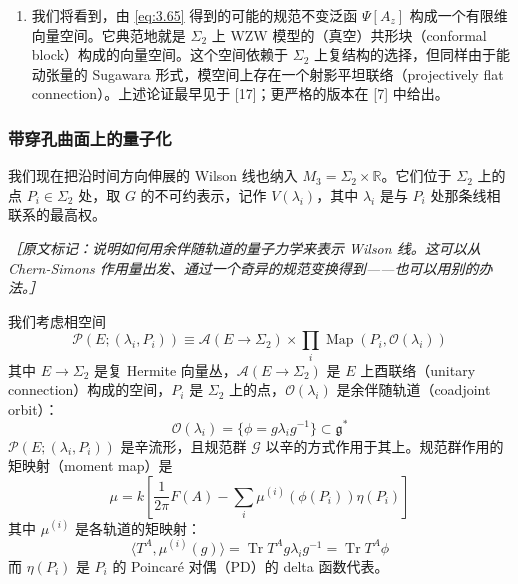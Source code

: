 
\begin{enumerate}[start=2]
  \item 我们将看到，由 \eqref{eq:3.65} 得到的可能的规范不变泛函 $\Psi[A_z]$ 构成一个有限维向量空间。它典范地就是 $\Sigma_2$ 上 WZW 模型的（真空）共形块（conformal block）构成的向量空间。这个空间依赖于 $\Sigma_2$ 上复结构的选择，但同样由于能动张量的 Sugawara 形式，模空间上存在一个射影平坦联络（projectively flat connection）。上述论证最早见于 [17]；更严格的版本在 [7] 中给出。
\end{enumerate}

\subsubsection{带穿孔曲面上的量子化} %

我们现在把沿时间方向伸展的 Wilson 线也纳入 $M_3=\Sigma_2\times\mathbb{R}$。它们位于 $\Sigma_2$ 上的点 $P_i\in\Sigma_2$ 处，取 $G$ 的不可约表示，记作 $V(\lambda_i)$，其中 $\lambda_i$ 是与 $P_i$ 处那条线相联系的最高权。

{\small\itshape ［原文标记：说明如何用余伴随轨道的量子力学来表示 Wilson 线。这可以从 Chern-Simons 作用量出发、通过一个奇异的规范变换得到——也可以用别的办法。］}

我们考虑相空间
\begin{equation}
  \mathcal{P}(E;(\lambda_i,P_i))\equiv\mathcal{A}(E\to\Sigma_2)\times\prod_i\operatorname{Map}(P_i,\mathcal{O}(\lambda_i))
  \tag{3.70}
  \label{eq:3.70}
\end{equation}
其中 $E\to\Sigma_2$ 是复 Hermite 向量丛，$\mathcal{A}(E\to\Sigma_2)$ 是 $E$ 上酉联络（unitary connection）构成的空间，$P_i$ 是 $\Sigma_2$ 上的点，$\mathcal{O}(\lambda_i)$ 是余伴随轨道（coadjoint orbit）：
\begin{equation}
  \mathcal{O}(\lambda_i)=\{\phi=g\lambda_i g^{-1}\}\subset\mathfrak{g}^*
  \tag{3.71}
  \label{eq:3.71}
\end{equation}
$\mathcal{P}(E;(\lambda_i,P_i))$ 是辛流形，且规范群 $\mathcal{G}$ 以辛的方式作用于其上。规范群作用的矩映射（moment map）是
\begin{equation}
  \mu=k\left[\frac{1}{2\pi}F(A)-\sum_i\mu^{(i)}(\phi(P_i))\eta(P_i)\right]
  \tag{3.72}
  \label{eq:3.72}
\end{equation}
其中 $\mu^{(i)}$ 是各轨道的矩映射：
\begin{equation}
  \langle T^A,\mu^{(i)}(g)\rangle=\operatorname{Tr}T^A g\lambda_i g^{-1}=\operatorname{Tr}T^A\phi
  \tag{3.73}
  \label{eq:3.73}
\end{equation}
而 $\eta(P_i)$ 是 $P_i$ 的 Poincaré 对偶（PD）的 delta 函数代表。

